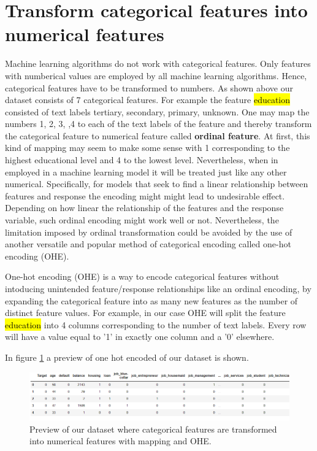 \section{Transform categorical features into numerical features}
Machine learning algorithms do not work with categorical features. Only features with numberical values are employed by all machine learning algorithms. Hence, categorical features have to be transformed to numbers. As shown above our dataset consists of 7 categorical features. For example the feature \hl{education} consisted of text labels {\color{blue} tertiary, secondary, primary, unknown}. One may map the numbers 1, 2, 3, ,4 to each of the text labels of the feature and thereby transform the categorical feature to numerical feature called {\color{blue} \textbf{ordinal feature}}. At first, this kind of mapping may seem to make some sense with 1 corresponding to the highest educational level and 4 to the lowest level. Nevertheless, when in employed in a machine learning model it will be treated just like any other numerical. Specifically, for models that seek to find a linear relationship between features and response the encoding might might lead to undesirable effect. Depending on how linear the relationship of the features and the response variable, such ordinal encoding might work well or not. Nevertheless, the limitation imposed by ordinal transformation could be avoided by the use of another versatile and popular method of categorical encoding called one-hot encoding (OHE).

One-hot encoding (OHE) is a way to encode categorical features without intoducing unintended feature/response relationships like an ordinal encoding, by expanding the categorical feature into as many new features as the number of distinct feature values. For example, in our case OHE will split the feature \hl{education} into 4 columns corresponding to the number of text labels. Every row will have a value equal to '1' in exactly one column and a '0' elsewhere.

In figure \ref{fig:df_OHE} a preview of one hot encoded of our dataset is shown.
 
\begin{figure}[tbh]
\centering
\includegraphics[width = 1.0\hsize]{./resources/img/fig_df_OHE.png}
\caption{Preview of our dataset where categorical features are transformed into numerical features with mapping and OHE.} 
\label{fig:df_OHE}
\end{figure}

